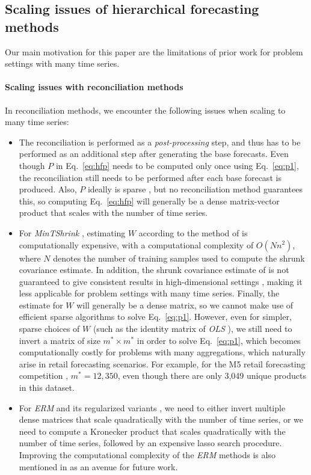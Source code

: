 \documentclass[preprint, 3p, times, twocolumn]{elsarticle}
\begin{document}
\subsection{Scaling issues of hierarchical forecasting methods} \label{subsec:ourwork}

Our main motivation for this paper are the limitations of prior work for problem settings with many time series.

\paragraph{Scaling issues with reconciliation methods} \label{sec:scalingissuesreconmethods}
In reconciliation methods, we encounter the following issues when scaling to many time series:
\begin{itemize}
  \item The reconciliation is performed as a \textit{post-processing} step, and thus has to be performed as an additional step after generating the base forecasts. Even though \(P\) in Eq.~\ref{eq:hfp} needs to be computed only once using Eq.~\eqref{eq:p1}, the reconciliation still needs to be performed after each base forecast is produced. Also, \(P\) ideally is sparse \cite{bentaieb_regularized_2019}, but no reconciliation method guarantees this, so computing Eq.~\eqref{eq:hfp} will generally be a dense matrix-vector product that scales with the number of time series.
  \item For \textit{MinTShrink} \cite{wickramasuriya_optimal_2019}, estimating \(W\) according to the method of \cite{schafer_shrinkage_2005} is computationally expensive, with a computational complexity of \(O(Nn^2)\), where \(N\) denotes the number of training samples used to compute the shrunk covariance estimate. In addition, the shrunk covariance estimate of \cite{schafer_shrinkage_2005} is not guaranteed to give consistent results in high-dimensional settings \cite{touloumis_nonparametric_2015}, making it less applicable for problem settings with many time series. Finally, the estimate for \(W\) will generally be a dense matrix, so we cannot make use of efficient sparse algorithms to solve Eq.~\eqref{eq:p1}. However, even for simpler, sparse choices of \(W\) (such as the identity matrix of \textit{OLS} \cite{hyndman_optimal_2011}), we still need to invert a matrix of size \(m^* \times m^*\) in order to solve Eq.~\eqref{eq:p1}, which becomes computationally costly for problems with many aggregations, which naturally arise in retail forecasting scenarios. For example, for the M5 retail forecasting competition \cite{makridakis_m5_2021}, \(m^*=12,350\), even though there are only 3,049 unique products in this dataset.  
  \item For \textit{ERM} and its regularized variants \cite{bentaieb_regularized_2019}, we need to either invert multiple dense matrices that scale quadratically with the number of time series, or we need to compute a Kronecker product that scales quadratically with the number of time series, followed by an expensive lasso search procedure. Improving the computational complexity of the \textit{ERM} methods is also mentioned in \cite{bentaieb_regularized_2019} as an avenue for future work.
\end{itemize}
\end{document}
